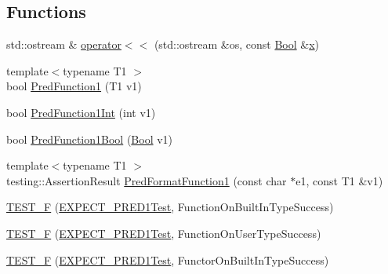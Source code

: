 \subsection*{Functions}
\begin{DoxyCompactItemize}
\item 
std\+::ostream \& \mbox{\hyperlink{googletest-master_2googletest_2test_2gtest__pred__impl__unittest_8cc_a0bf98bd8ef2c5ea5ea36ff15c1248b8a}{operator$<$$<$}} (std\+::ostream \&os, const \mbox{\hyperlink{struct_bool}{Bool}} \&\mbox{\hyperlink{_obj__test_2lib_2googletest-master_2googlemock_2test_2gmock-matchers__test_8cc_a6150e0515f7202e2fb518f7206ed97dc}{x}})
\item 
{\footnotesize template$<$typename T1 $>$ }\\bool \mbox{\hyperlink{googletest-master_2googletest_2test_2gtest__pred__impl__unittest_8cc_aa8827b7fab495de26f406affdf47a697}{Pred\+Function1}} (T1 v1)
\item 
bool \mbox{\hyperlink{googletest-master_2googletest_2test_2gtest__pred__impl__unittest_8cc_a0cfa23f9b62be9c5bf65d0971510bac5}{Pred\+Function1\+Int}} (int v1)
\item 
bool \mbox{\hyperlink{googletest-master_2googletest_2test_2gtest__pred__impl__unittest_8cc_a1c12be7e61ecd333d5c9d5f251d3809f}{Pred\+Function1\+Bool}} (\mbox{\hyperlink{struct_bool}{Bool}} v1)
\item 
{\footnotesize template$<$typename T1 $>$ }\\testing\+::\+Assertion\+Result \mbox{\hyperlink{googletest-master_2googletest_2test_2gtest__pred__impl__unittest_8cc_af5b63802199e417c73c46cbacc73f4ed}{Pred\+Format\+Function1}} (const char $\ast$e1, const T1 \&v1)
\item 
\mbox{\hyperlink{googletest-master_2googletest_2test_2gtest__pred__impl__unittest_8cc_acf6422eca13944f695085fc6c7527748}{T\+E\+S\+T\+\_\+F}} (\mbox{\hyperlink{googletest-master_2googletest_2test_2gtest__pred__impl__unittest_8cc_ad745775376a8f891faadd4d168798bab}{E\+X\+P\+E\+C\+T\+\_\+\+P\+R\+E\+D1\+Test}}, Function\+On\+Built\+In\+Type\+Success)
\item 
\mbox{\hyperlink{googletest-master_2googletest_2test_2gtest__pred__impl__unittest_8cc_a7ae9f4aac70507b021c7f828ba06c600}{T\+E\+S\+T\+\_\+F}} (\mbox{\hyperlink{googletest-master_2googletest_2test_2gtest__pred__impl__unittest_8cc_ad745775376a8f891faadd4d168798bab}{E\+X\+P\+E\+C\+T\+\_\+\+P\+R\+E\+D1\+Test}}, Function\+On\+User\+Type\+Success)
\item 
\mbox{\hyperlink{googletest-master_2googletest_2test_2gtest__pred__impl__unittest_8cc_ac6309545f87fbb12ae87710af1dddf0a}{T\+E\+S\+T\+\_\+F}} (\mbox{\hyperlink{googletest-master_2googletest_2test_2gtest__pred__impl__unittest_8cc_ad745775376a8f891faadd4d168798bab}{E\+X\+P\+E\+C\+T\+\_\+\+P\+R\+E\+D1\+Test}}, Functor\+On\+Built\+In\+Type\+Success)

\end{DoxyCompactItemize}
